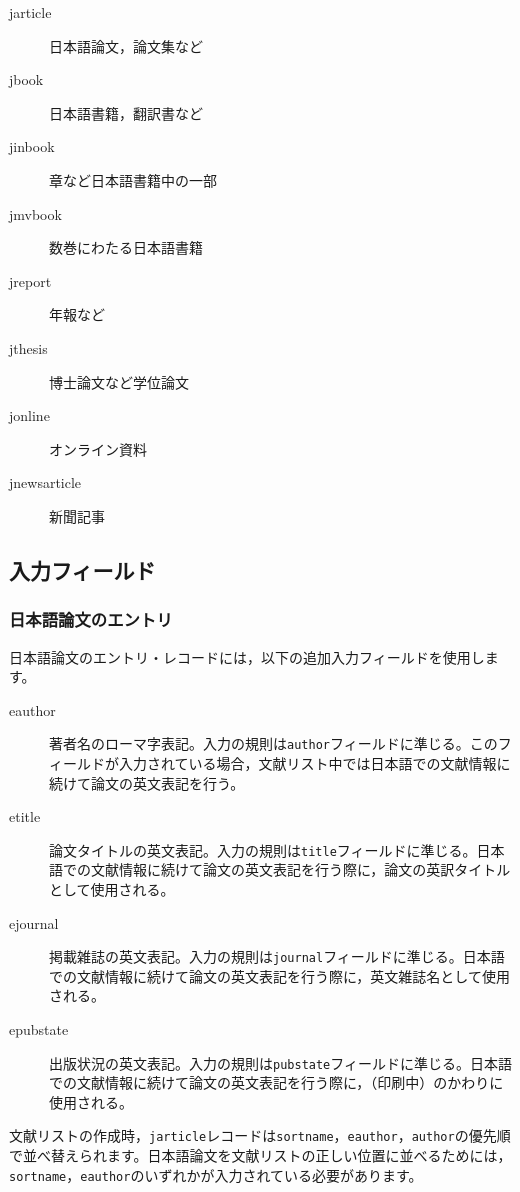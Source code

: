 \documentclass[12pt]{ltjsarticle}
\begin{document}
\begin{description}
  \item[jarticle]日本語論文，論文集など
  \item[jbook]日本語書籍，翻訳書など
  \item[jinbook]章など日本語書籍中の一部
  \item[jmvbook]数巻にわたる日本語書籍
  \item[jreport]年報など
  \item[jthesis]博士論文など学位論文
  \item[jonline]オンライン資料
  \item[jnewsarticle]新聞記事
\end{description}

\subsection{入力フィールド}

\subsubsection{日本語論文のエントリ}

日本語論文のエントリ・レコードには，以下の追加入力フィールドを使用します。
\begin{description}
\item[eauthor] 著者名のローマ字表記。入力の規則は\texttt{author}フィールドに準じる。このフィールドが入力されている場合，文献リスト中では日本語での文献情報に続けて論文の英文表記を行う。

\item[etitle] 論文タイトルの英文表記。入力の規則は\texttt{title}フィールドに準じる。日本語での文献情報に続けて論文の英文表記を行う際に，論文の英訳タイトルとして使用される。

\item[ejournal] 掲載雑誌の英文表記。入力の規則は\texttt{journal}フィールドに準じる。日本語での文献情報に続けて論文の英文表記を行う際に，英文雑誌名として使用される。

\item[epubstate] 出版状況の英文表記。入力の規則は\texttt{pubstate}フィールドに準じる。日本語での文献情報に続けて論文の英文表記を行う際に，（印刷中）のかわりに使用される。
\end{description}

文献リストの作成時，\texttt{jarticle}レコードは\texttt{sortname}，\texttt{eauthor}，\texttt{author}の優先順で並べ替えられます。日本語論文を文献リストの正しい位置に並べるためには，\texttt{sortname}，\texttt{eauthor}のいずれかが入力されている必要があります。
\end{document}

